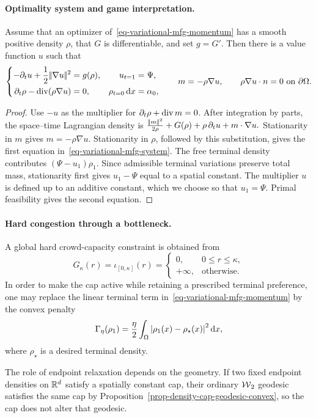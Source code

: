 \paragraph{Optimality system and game interpretation.}
\begin{prop}\label{prop-variational-mfg-system}
Assume that an optimizer of~\eqref{eq-variational-mfg-momentum} has a smooth positive density $\rho$, that $G$ is differentiable, and set $g=G'$. Then there is a value function $u$ such that
\begin{equation}\label{eq-variational-mfg-system}
\left\{
\begin{aligned}
-\partial_tu+\frac12|\!| \nabla u |\!|^2&=g(\rho),
& u_{t=1}&=\Psi,\\
\partial_t\rho-\operatorname{div}(\rho\nabla u)&=0,
& \rho_{t=0}\,\mathrm{d} x&=\alpha_0,
\end{aligned}
\right.
\qquad
m=-\rho\nabla u,
\qquad
\rho\nabla u\cdot n=0\ \text{on }\partial\Omega.
\end{equation}
\end{prop}
\begin{proof}
Use $-u$ as the multiplier for $\partial_t\rho+\operatorname{div} m=0$. After integration by parts, the space--time Lagrangian density is \(\frac{|\!| m |\!|^2}{2\rho}+G(\rho) +\rho\,\partial_tu+m\cdot\nabla u.\)
Stationarity in $m$ gives $m=-\rho\nabla u$. Stationarity in $\rho$, followed by this substitution, gives the first equation in~\eqref{eq-variational-mfg-system}. The free terminal density contributes $(\Psi-u_1)\rho_1$. Since admissible terminal variations preserve total mass, stationarity first gives $u_1-\Psi$ equal to a spatial constant. The multiplier $u$ is defined up to an additive constant, which we choose so that $u_1=\Psi$. Primal feasibility gives the second equation.
\end{proof}
\paragraph{Hard congestion through a bottleneck.}
A global hard crowd-capacity constraint is obtained from
\begin{equation}\label{eq-variational-mfg-hard-cap}
G_\kappa(r)=\iota_{[0,\kappa]}(r)
=
\begin{cases}
0,&0\leq r\leq\kappa,\\
+\infty,&\text{otherwise}.
\end{cases}
\end{equation}
In order to make the cap active while retaining a prescribed terminal preference, one may replace the linear terminal term in~\eqref{eq-variational-mfg-momentum} by the convex penalty
\begin{equation}\label{eq-variational-mfg-quadratic-terminal}
\Gamma_\eta(\rho_1)
=
\frac{\eta}{2}
\int_\Omega\left\lvert\rho_1(x)-\rho_\star(x)\right\rvert^2\mathrm{d} x,
\end{equation}
where $\rho_\star$ is a desired terminal density.

The role of endpoint relaxation depends on the geometry. If two fixed endpoint densities on $\mathbb{R}^d$ satisfy a spatially constant cap, their ordinary $\operatorname{\mathcal{W}}_2$ geodesic satisfies the same cap by Proposition~\ref{prop-density-cap-geodesic-convex}, so the cap does not alter that geodesic.
